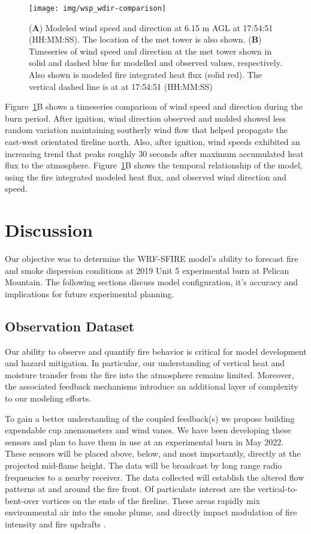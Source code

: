 \documentclass[preprints,article,accept,moreauthors,pdftex]{Definitions/mdpi}
\begin{document}
\begin{figure}[H]
\centering
 \texttt{[image: img/wsp\_wdir-comparison]}
 \caption{(\textbf{A}) Modeled wind speed and direction at 6.15 m AGL at 17:54:51 (HH:MM:SS). The location of the met tower is also shown. (\textbf{B}) Timeseries of wind speed and direction at the met tower shown in solid and dashed blue for modelled and observed values, respectively. Also shown is modeled fire integrated heat flux (solid red). The vertical dashed line is at at 17:54:51 (HH:MM:SS)\label{fig7}}
 \end{figure}

Figure~\ref{fig7}B shows a timeseries comparison of wind speed and direction during the burn period. After ignition, wind direction observed and molded showed less random variation maintaining southerly wind flow that helped propagate the east-west orientated fireline north. Also, after ignition, wind speeds exhibited an increasing trend that peaks roughly 30 seconds after maximum accumulated heat flux to the atmosphere. Figure~\ref{fig7}B shows the temporal relationship of the model, using the fire integrated modeled heat flux, and observed wind direction and speed.

\section{Discussion}

Our objective was to determine the WRF-SFIRE model’s ability to forecast fire and smoke dispersion conditions at 2019 Unit 5 experimental burn at Pelican Mountain. The following sections discuss model configuration, it's accuracy and implications for future experimental planning.

\subsection{Observation Dataset}

Our ability to observe and quantify fire behavior is critical for model development and hazard mitigation. In particular, our understanding of vertical heat and moisture transfer from the fire into the atmosphere remains limited. Moreover, the associated feedback mechanisms introduce an additional layer of complexity to our modeling efforts.

To gain a better understanding of the coupled feedback(s) we propose building expendable cup anemometers and wind vanes. We have been developing these sensors and plan to have them in use at an experimental burn in May 2022. These sensors will be placed above, below, and most importantly, directly at the projected mid-flame height. The data will be broadcast by long range radio frequencies to a nearby receiver. The data collected will establish the altered flow patterns at and around the fire front. Of particulate interest are the vertical-to-bent-over vortices on the ends of the fireline. These areas rapidly mix environmental air into the smoke plume, and directly impact modulation of fire intensity and fire updrafts \cite{moisseeva_capturing_2019,moisseeva_wildfire_2021,clements_fire_2016}.
\end{document}
